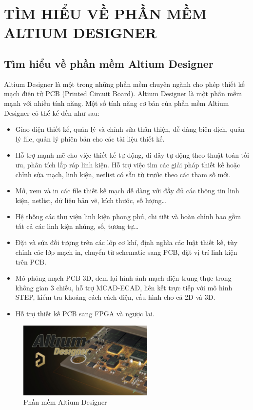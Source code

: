 \chapter{TÌM HIỂU VỀ PHẦN MỀM ALTIUM DESIGNER}
    \section{Tìm hiểu về phần mềm Altium Designer}
        Altium Designer là một trong những phần mềm chuyên ngành cho phép thiết kế mạch điện tử PCB (Printed Circuit Board). Altium Designer là một phần mềm mạnh với nhiều tính năng. Một số tính năng cơ bản của phần mềm Altium Designer có thể kể đến như sau:
        \begin{itemize}
            \item Giao diện thiết kế, quản lý và chỉnh sửa thân thiện, dễ dàng biên dịch, quản lý file, quản lý phiên bản cho các tài liệu thiết kế.
            \item Hỗ trợ mạnh mẽ cho việc thiết kế tự động, đi dây tự động theo thuật toán tối ưu, phân tích lắp ráp linh kiện. Hỗ trợ việc tìm các giải pháp thiết kế hoặc chỉnh sửa mạch, linh kiện, netlist có sẵn từ trước theo các tham số mới.
            \item Mở, xem và in các file thiết kế mạch dễ dàng với đầy đủ các thông tin linh kiện, netlist, dữ liệu bản vẽ, kích thước, số lượng…
            \item Hệ thống các thư viện linh kiện phong phú, chi tiết và hoàn chỉnh bao gồm tất cả các linh kiện nhúng, số, tương tự…
            \item Đặt và sửa đối tượng trên các lớp cơ khí, định nghĩa các luật thiết kế, tùy chỉnh các lớp mạch in, chuyển từ schematic sang PCB, đặt vị trí linh kiện trên PCB.
            \item Mô phỏng mạch PCB 3D, đem lại hình ảnh mạch điện trung thực trong không gian 3 chiều, hỗ trợ MCAD-ECAD, liên kết trực tiếp với mô hình STEP, kiểm tra khoảng cách cách điện, cấu hình cho cả 2D và 3D.
            \item Hỗ trợ thiết kế PCB sang FPGA và ngược lại.
        \end{itemize}
        \begin{figure}[H]
            \centering
            \includegraphics[width=0.6\textwidth]{pictures/altium.png}
            \caption{Phần mềm Altium Designer}
            \label{fig:altium}
        \end{figure}
        \cleardoublepage
